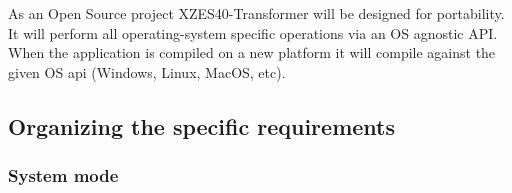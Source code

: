 As an Open Source project XZES40-Transformer will be designed for portability.
It will perform all operating-system specific operations via an OS agnostic API.
When the application is compiled on a new platform it will compile against the given OS api (Windows, Linux, MacOS, etc).


\subsection{Organizing the specific requirements}


\subsubsection{System mode}

